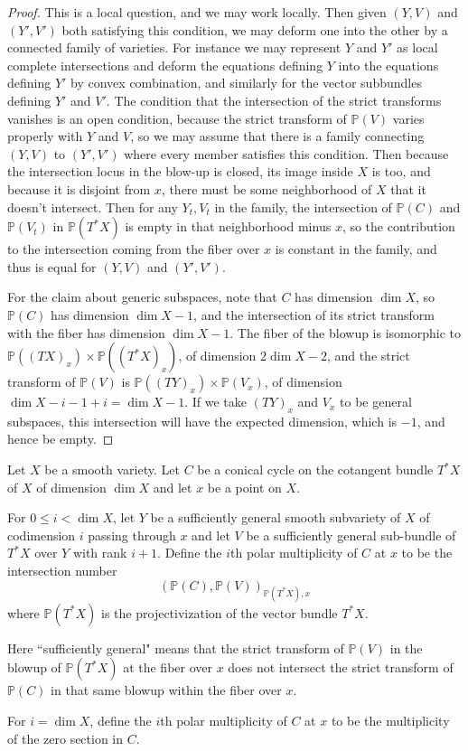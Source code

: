 \begin{proof} This is a local question, and we may work locally.  Then given $(Y,V)$ and $(Y',V')$ both satisfying this condition, we may deform one into the other by a connected family of varieties. For instance we may represent $Y$ and $Y'$ as local complete intersections and deform the equations defining $Y$ into the equations defining $Y'$ by convex combination, and similarly for the vector subbundles defining $Y'$ and $V'$. The condition that the intersection of the strict transforms vanishes is an open condition, because the strict transform of $\mathbb P(V)$ varies properly with $Y$ and $V$, so we may assume that there is a family connecting $(Y,V)$ to $(Y',V')$ where every member satisfies this condition. Then because the intersection locus in the blow-up is closed, its image inside $X$ is too, and because it is disjoint from $x$, there must be some neighborhood of $X$ that it doesn't intersect. Then for any $Y_t,V_t$ in the family, the intersection of $\mathbb P(C)$ and $\mathbb P(V_t)$ in $\mathbb P (T^* X)$ is empty in that neighborhood minus $x$, so the contribution to the intersection coming from the fiber over $x$ is constant in the family, and thus is equal for $(Y,V)$ and $(Y',V')$.

For the claim about generic subspaces, note that $C$ has dimension $\dim X$, so $\mathbb P(C)$ has dimension $\dim X-1$, and the intersection of its strict transform with the fiber has dimension $\dim X-1$.  The fiber of the blowup is isomorphic to $\mathbb P( (TX)_x ) \times \mathbb P( (T^*X)_x )$, of dimension $2 \dim X - 2$, and the strict transform of $\mathbb P(V)$ is $\mathbb P((TY)_x) \times \mathbb P ( V_x)$, of dimension $\dim X - i -1 + i = \dim X-1$. If we take $(TY)_x$ and $V_x$ to be general subspaces, this intersection will have the expected dimension, which is $-1$, and hence be empty. \end{proof}



\begin{defi}
\notready\label{polar-multiplicity-2} Let $X$ be a smooth variety. Let $C$ be a conical cycle on the cotangent bundle $T^* X$ of $X$ of dimension $\dim X$ and let $x$ be a point on $X$.

For $0 \leq i< \dim X$, let $Y$ be a sufficiently general smooth subvariety of $X$ of codimension $i$ passing through $x$ and let $V$ be a sufficiently general sub-bundle of $T^* X$ over $Y$ with rank $i+1$. Define the $i$th polar multiplicity of $C$ at $x$ to be the intersection number \[ ( \mathbb P(C) , \mathbb P(V))_{ \mathbb P(T^* X), x} \] where $\mathbb P(T^* X)$ is the projectivization of the vector bundle $T^* X$.

Here ``sufficiently general" means that the strict transform of $\mathbb P(V)$ in the blowup of $\mathbb P(T^* X)$ at the fiber over $x$ does not intersect the strict transform of $\mathbb P(C)$ in that same blowup within the fiber over $x$.

For $i=\dim X$, define the $i$th polar multiplicity of $C$ at $x$ to be the multiplicity of the zero section in $C$. \end{defi}

